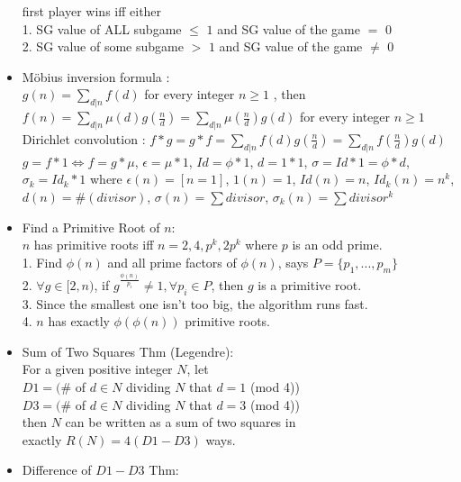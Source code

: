 \begin{itemize}
  first player wins iff either\\
  1. SG value of ALL subgame $\le$ $1$ and SG value of the game $=$ $0$\\
  2. SG value of some subgame $>$ $1$ and SG value of the game $\neq$ $0$
\item Möbius inversion formula :\\
  $g(n) = \sum\limits_{d|n}f(d)$ for every integer $n\ge 1$ , then\\
  $f(n) = \sum\limits_{d|n}\mu(d)g(\frac{n}{d}) = \sum\limits_{d|n}\mu(\frac{n}{d})g(d)$ for every integer $n\ge 1$\\
  Dirichlet convolution : $f*g=g*f=\sum\limits_{d|n}f(d)g(\frac{n}{d})=\sum\limits_{d|n}f(\frac{n}{d})g(d)$\\
  $g=f*1\Leftrightarrow f=g*\mu$, $\epsilon=\mu*1$, $Id=\phi*1$, $d=1*1$, $\sigma=Id*1=\phi*d$,\\
  $\sigma_k=Id_k*1$ where $\epsilon(n)=[n=1]$, $1(n)=1$, $Id(n)=n$, $Id_k(n)=n^k$,\\
  $d(n)=\#(divisor)$, $\sigma(n)=\sum divisor$, $\sigma_k(n)=\sum divisor^k$
\item Find a Primitive Root of $n$:\\
  $n$ has primitive roots iff $n=2,4,p^k,2p^k$ where $p$ is an odd prime.\\
  1. Find $\phi(n)$ and all prime factors of $\phi(n)$, says $P=\{p_1,...,p_m\}$\\
  2. $\forall g\in[2,n)$, if $g^{\frac{\phi(n)}{p_i}}\ne 1,\forall p_i\in P$, then $g$ is a primitive root.\\
  3. Since the smallest one isn't too big, the algorithm runs fast.\\
  4. $n$ has exactly $\phi(\phi(n))$ primitive roots.
\item Sum of Two Squares Thm (Legendre):\\
  For a given positive integer $N$, let\\
  $D1 = (\#$ of $d \in N$ dividing $N$ that $d=1$ (mod 4))\\
  $D3 = (\#$ of $d \in N$ dividing $N$ that $d=3$ (mod 4))\\
  then $N$ can be written as a sum of two squares in\\
  exactly $R(N) = 4(D1-D3)$ ways.
\item Difference of $D1-D3$ Thm:\\

\end{itemize}
